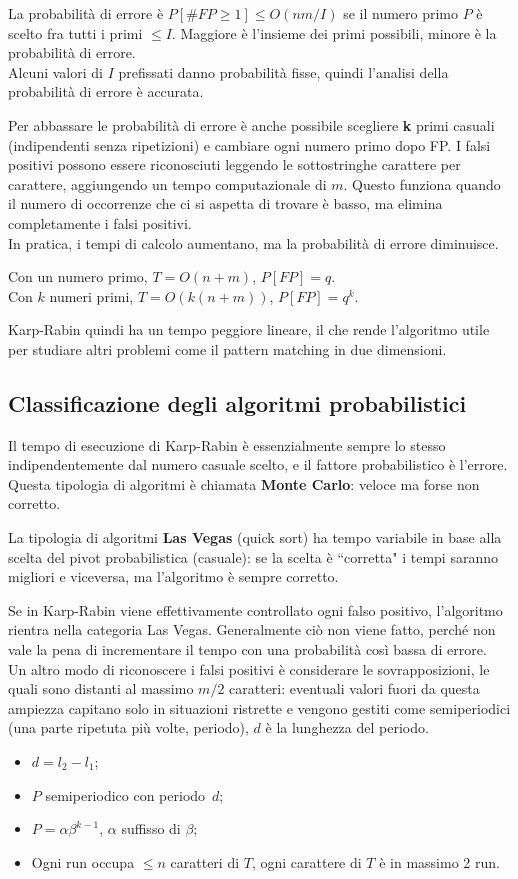 La probabilità di errore è $P[\#FP \geq 1 ] \leq O(nm / I)$ se il numero primo $P$ è scelto fra tutti i primi $\leq I$. Maggiore è l'insieme dei primi possibili, minore è la probabilità di errore. \\
Alcuni valori di $I$ prefissati danno probabilità fisse, quindi l'analisi della probabilità di errore è accurata. 

Per abbassare le probabilità di errore è anche possibile scegliere \textbf{k} primi casuali (indipendenti senza ripetizioni) e cambiare ogni numero primo dopo FP. I falsi positivi possono essere riconosciuti leggendo le sottostringhe carattere per carattere, aggiungendo un tempo computazionale di $m$. Questo funziona quando il numero di occorrenze che ci si aspetta di trovare è basso, ma elimina completamente i falsi positivi. \\ 
In pratica, i tempi di calcolo aumentano, ma la probabilità di errore diminuisce. 

Con un numero primo, $T = O(n + m)$, $P[FP] = q$. \\
Con $k$ numeri primi, $T = O(k(n + m))$, $P[FP] = q^k$. 

Karp-Rabin quindi ha un tempo peggiore lineare, il che rende l'algoritmo utile per studiare altri problemi come il pattern matching in due dimensioni.

\subsection{Classificazione degli algoritmi probabilistici}
Il tempo di esecuzione di Karp-Rabin è essenzialmente sempre lo stesso indipendentemente dal numero casuale scelto, e il fattore probabilistico è l'errore. Questa tipologia di algoritmi è chiamata \textbf{Monte Carlo}: veloce ma forse non corretto. 

La tipologia di algoritmi \textbf{Las Vegas} (quick sort) ha tempo variabile in base alla scelta del pivot probabilistica (casuale): se la scelta è ``corretta" i tempi saranno migliori e viceversa, ma l'algoritmo è sempre corretto. 

Se in Karp-Rabin viene effettivamente controllato ogni falso positivo, l'algoritmo rientra nella categoria Las Vegas. Generalmente ciò non viene fatto, perché non vale la pena di incrementare il tempo con una probabilità così bassa di errore. \\
Un altro modo di riconoscere i falsi positivi è considerare le sovrapposizioni, le quali sono distanti al massimo $m / 2$ caratteri: eventuali valori fuori da questa ampiezza capitano solo in situazioni ristrette e vengono gestiti come semiperiodici (una parte ripetuta più volte, periodo), $d$ è la lunghezza del periodo. 

\begin{itemize}
	\item $d = l_2 - l_1$; 
	\item $P$ semiperiodico con periodo\ $d$; 
	\item $P = \alpha\beta^{k-1}$, $\alpha$ suffisso di $\beta$;
	\item Ogni run occupa $\leq n$ caratteri di $T$, ogni carattere di $T$ è in massimo 2 run.
\end{itemize}
